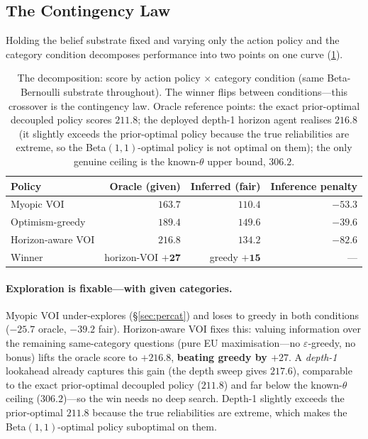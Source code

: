 \documentclass[11pt]{article}
\begin{document}
\subsection{The Contingency Law}
\label{sec:contingency}

Holding the belief substrate fixed and varying only the action policy and the category condition decomposes performance into two points on one curve (\cref{tab:decomp}).

\begin{table}[t]
\centering
\caption{The decomposition: score by action policy $\times$ category condition (same Beta-Bernoulli substrate throughout). The winner flips between conditions---this crossover is the contingency law. Oracle reference points: the exact prior-optimal decoupled policy scores $211.8$; the deployed depth-1 horizon agent realises $216.8$ (it slightly exceeds the prior-optimal policy because the true reliabilities are extreme, so the Beta$(1,1)$-optimal policy is not optimal on them); the only genuine ceiling is the known-$\theta$ upper bound, $306.2$.}
\label{tab:decomp}
\small
\begin{tabular}{@{}lrrr@{}}
\toprule
Policy & Oracle (given) & Inferred (fair) & Inference penalty \\
\midrule
Myopic VOI & $163.7$ & $110.4$ & $-53.3$ \\
Optimism-greedy & $189.4$ & $149.6$ & $-39.6$ \\
Horizon-aware VOI & $\mathbf{216.8}$ & $134.2$ & $-82.6$ \\
\midrule
Winner & horizon-VOI $\mathbf{+27}$ & greedy $\mathbf{+15}$ & --- \\
\bottomrule
\end{tabular}
\end{table}

\paragraph{Exploration is fixable---with given categories.} Myopic VOI under-explores (\S\ref{sec:percat}) and loses to greedy in both conditions ($-25.7$ oracle, $-39.2$ fair). Horizon-aware VOI fixes this: valuing information over the remaining same-category questions (pure EU maximisation---no $\varepsilon$-greedy, no bonus) lifts the oracle score to $+216.8$, \textbf{beating greedy by $+27$}. A \emph{depth-1} lookahead already captures this gain (the depth sweep gives $217.6$), comparable to the exact prior-optimal decoupled policy ($211.8$) and far below the known-$\theta$ ceiling ($306.2$)---so the win needs no deep search. Depth-1 slightly exceeds the prior-optimal $211.8$ because the true reliabilities are extreme, which makes the Beta$(1,1)$-optimal policy suboptimal on them.
\end{document}
